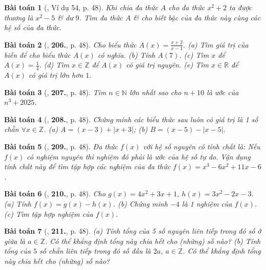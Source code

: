 \documentclass{article}
\numberwithin{equation}{section}
\newtheorem{baitoan}{Bài toán}
\begin{document}
\begin{baitoan}[\cite{Tuyen_Toan_7}, Ví dụ 54, p. 48]
	Khi chia đa thức $A$ cho đa thức $x^2 + 2$ ta được thương là $x^2 - 5$ \& dư $9$. Tìm đa thức $A$ \& cho biết bậc của đa thức này cùng các hệ số của đa thức.
\end{baitoan}

\begin{baitoan}[\cite{Tuyen_Toan_7}, \textbf{206.}, p. 48]
	Cho biểu thức $A(x) = \frac{x + 2}{x - 1}$. (a) Tìm giá trị của biến để cho biểu thức $A(x)$ có nghĩa. (b) Tính $A(7)$. (c) Tìm $x$ để $A(x) = \frac{1}{4}$. (d) Tìm $x\in\mathbb{Z}$ để $A(x)$ có giá trị nguyên. (e) Tìm $x\in\mathbb{R}$ để $A(x)$ có giá trị lớn hơn $1$.
\end{baitoan}

\begin{baitoan}[\cite{Tuyen_Toan_7}, \textbf{207.}, p. 48]
	Tìm $n\in\mathbb{N}$ lớn nhất sao cho $n + 10$ là ước của $n^3 + 2025$.
\end{baitoan}

\begin{baitoan}[\cite{Tuyen_Toan_7}, \textbf{208.}, p. 48]
	Chứng minh các biểu thức sau luôn có giá trị là 1 số chẵn $\forall x\in\mathbb{Z}$. (a) $A = (x - 3) + |x + 3|$; (b) $B = (x - 5) - |x - 5|$.
\end{baitoan}

\begin{baitoan}[\cite{Tuyen_Toan_7}, \textbf{209.}, p. 48]
	Đa thức $f(x)$ với hệ số nguyên có tính chất là: Nếu $f(x)$ có nghiệm nguyên thì nghiệm đó phải là ước của hệ số tự do. Vận dụng tính chất này để tìm tập hợp các nghiệm của đa thức $f(x) = x^3 - 6x^2 + 11x - 6$.
\end{baitoan}

\begin{baitoan}[\cite{Tuyen_Toan_7}, \textbf{210.}, p. 48]
	Cho $g(x) = 4x^2 + 3x + 1$, $h(x) = 3x^2 - 2x - 3$. (a) Tính $f(x) = g(x) - h(x)$. (b) Chứng minh $-4$ là 1 nghiệm của $f(x)$. (c) Tìm tập hợp nghiệm của $f(x)$.
\end{baitoan}

\begin{baitoan}[\cite{Tuyen_Toan_7}, \textbf{211.}, p. 48]
	(a) Tính tổng của 5 số nguyên liên tiếp trong đó số ở giữa là $a\in\mathbb{Z}$. Có thể khẳng định tổng này chia hết cho (những) số nào? (b) Tính tổng của $5$ số chẵn liên tiếp trong đó số đầu là $2a$, $a\in\mathbb{Z}$. Có thể khẳng định tổng này chia hết cho (những) số nào?
\end{baitoan}
\end{document}
